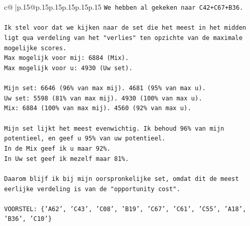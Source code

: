 \documentclass{article}
\begin{document}
{\begin{supertabular}{c@{$\;$}|p{.15\linewidth}@{}p{.15\linewidth}p{.15\linewidth}p{.15\linewidth}p{.15\linewidth}p{.15\linewidth}}
{{{\texttt{We hebben al gekeken naar C42+C67+B36.} \\
\\ 
\texttt{Ik stel voor dat we kijken naar de set die het meest in het midden ligt qua verdeling van het "verlies" ten opzichte van de maximale mogelijke scores.} \\
\texttt{Max mogelijk voor mij: 6884 (Mix).} \\
\texttt{Max mogelijk voor u: 4930 (Uw set).} \\
\\ 
\texttt{Mijn set: 6646 (96\% van max mij). 4681 (95\% van max u).} \\
\texttt{Uw set: 5598 (81\% van max mij). 4930 (100\% van max u).} \\
\texttt{Mix: 6884 (100\% van max mij). 4560 (92\% van max u).} \\
\\ 
\texttt{Mijn set lijkt het meest evenwichtig. Ik behoud 96\% van mijn potentieel, en geef u 95\% van uw potentieel.} \\
\texttt{In de Mix geef ik u maar 92\%.} \\
\texttt{In Uw set geef ik mezelf maar 81\%.} \\
\\ 
\texttt{Daarom blijf ik bij mijn oorspronkelijke set, omdat dit de meest eerlijke verdeling is van de "opportunity cost".} \\
\\ 
\texttt{VOORSTEL: \{'A62', 'C43', 'C08', 'B19', 'C67', 'C61', 'C55', 'A18', 'B36', 'C10'\}} \\
            }
        }
    }
     \\ \\


\end{supertabular}}
\end{document}
